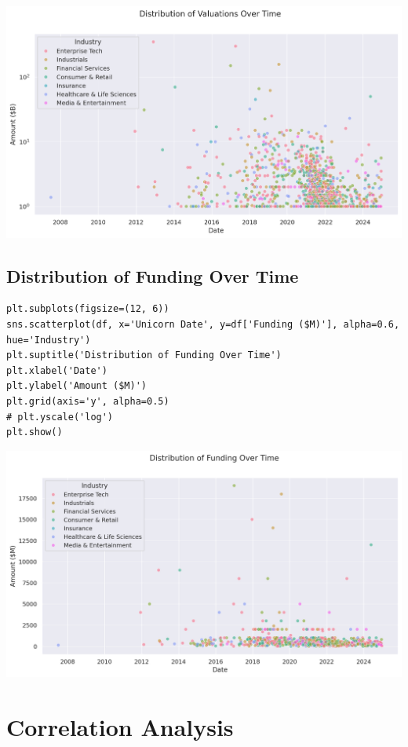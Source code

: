 \documentclass[a4paper,12pt]{article}
\begin{document}
\begin{center}
\includegraphics[width=.9\linewidth]{./.ob-jupyter/3952b0ffe7cc6297ac4c314ed80d5b934e4dd585.png}
\label{}
\end{center}
\subsection{Distribution of Funding Over Time}
\label{sec:org835f413}

\begin{verbatim}
plt.subplots(figsize=(12, 6))
sns.scatterplot(df, x='Unicorn Date', y=df['Funding ($M)'], alpha=0.6, hue='Industry')
plt.suptitle('Distribution of Funding Over Time')
plt.xlabel('Date')
plt.ylabel('Amount ($M)')
plt.grid(axis='y', alpha=0.5)
# plt.yscale('log')
plt.show()
\end{verbatim}

\begin{center}
\includegraphics[width=.9\linewidth]{./.ob-jupyter/a358841530629a3897fd535343447d3cbaf3a4bb.png}
\label{}
\end{center}
\section{Correlation Analysis}
\label{sec:org33e7c20}
\end{document}
